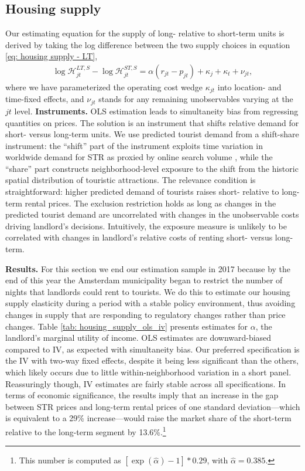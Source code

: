 \documentclass[11pt]{article}
\makeatletter
\newcommand{\Paragraph}{\vspace{0.1cm}\noindent\textbf}
\let\conditionalinput\@input
\makeatother
\begin{document}
\subsection{Housing supply}\label{sec: housing_supply estimation}
Our estimating equation for the supply of long- relative to short-term units is derived by taking the log difference between the two supply choices in equation \eqref{eq: housing supply - LT},
\begin{align*}
    \log \mathcal{H}^{LT,S}_{jt} -\log \mathcal{H}^{ST,S}_{jt} = \alpha \left( r_{jt}- p_{jt} \right) + \kappa_{j} + \kappa_{t} +\nu_{jt},
\end{align*}
where we have parameterized the operating cost wedge $\kappa_{jt}$ into location- and time-fixed effects, and $\nu_{jt}$ stands for any remaining unobservables varying at the $jt$ level. 
\Paragraph{Instruments.} OLS estimation leads to simultaneity bias from regressing quantities on prices. The solution is an instrument that shifts relative demand for short- versus long-term units. We use predicted tourist demand from a shift-share instrument: the ``shift'' part of the instrument exploits time variation in worldwide demand for STR as proxied by online search volume \citep{barron2021effect}, while the ``share'' part constructs neighborhood-level exposure to the shift from the historic spatial distribution of touristic attractions. The relevance condition is straightforward: higher predicted demand of tourists raises short- relative to long-term rental prices. The exclusion restriction holds as long as changes in the predicted tourist demand are uncorrelated with changes in the unobservable costs driving landlord's decisions. Intuitively, the exposure measure is unlikely to be correlated with changes in landlord's relative costs of renting short- versus long-term.

\conditionalinput{output/tables/housing_supply_estimates_table.tex}

\Paragraph{Results.} For this section we end our estimation sample in 2017 because by the end of this year the Amsterdam municipality began to restrict the number of nights that landlords could rent to tourists. We do this to estimate our housing supply elasticity during a period with a stable policy environment, thus avoiding changes in supply that are responding to regulatory changes rather than price changes. Table \ref{tab: housing_supply_ols_iv}
presents estimates for $\alpha$, the landlord's marginal utility of income. OLS estimates are downward-biased compared to IV, as expected with simultaneity bias. Our preferred specification is the IV with two-way fixed effects, despite it being less significant than the others, which likely occurs due to little within-neighborhood variation in a short panel. Reassuringly though, IV estimates are fairly stable across all specifications. In terms of economic significance, the results imply that an increase in the gap between STR prices and long-term rental prices of one standard deviation---which is equivalent to a 29\% increase---would raise the market share of the short-term relative to the long-term segment by 13.6\%.\footnote{This number is computed as $[\exp(\hat{\alpha})-1]*0.29$, with $\hat{\alpha}=0.385$.} 
\end{document}
